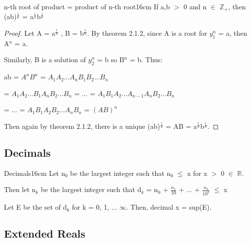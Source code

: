 	\newpage



	\begin{corollary}{n-th root of product = product of n-th root}{16cm}
		If a,b $>$ 0 and n $\in$ $\mathbb{Z}_+$, then
		(ab)$^{\frac{1}{n}}$ = a$^{\frac{1}{n}}$b$^{\frac{1}{n}}$
	\end{corollary}
	
	\begin{proof}
		Let A = a$^{\frac{1}{n}}$ , B = b$^{\frac{1}{n}}$.
		By {\color{red} theorem 2.1.2}, since A is a root for
		$y_1^n$ = a, then A$^n$ = a.

		Similarly, B is a solution of $y_2^n$ = b so B$^n$ = b. Thus:

		\hspace{1cm} ab = $A^n$$B^n$ = $A_1A_2...A_nB_1B_2...B_n$

		\hspace{1.6cm} = $A_1A_2...B_1A_nB_2...B_n$
		= ... = $A_1B_1A_2...A_{n-1}A_nB_2...B_n$

		\hspace{1.6cm} = ... = $A_1B_1A_2B_2...A_nB_n$ = $(AB)^n$

		Then again by {\color{red} theorem 2.1.2}, there is a unique
		(ab)$^{\frac{1}{n}}$ = AB = a$^{\frac{1}{n}}$b$^{\frac{1}{n}}$.		
	\end{proof}

	\vspace{0.5cm}




	
\subsection{ Decimals }

	\begin{definition}{Decimals}{16cm}
		Let n$_0$ be the largest integer such that n$_0$ $\leq$ x for
		x $>$ 0 $\in$ $\mathbb{R}$.

		Then let n$_k$ be the largest integer such that
		d$_k$ = n$_0$ + $\frac{n_1}{10}$ + ... + $\frac{n_k}{10^k}$ $\leq$ x

		Let E be the set of d$_k$ for k = 0, 1, ... $\infty$.
		Then, {\color{lblue} decimal} x = sup(E).	
	\end{definition}

	\vspace{0.5cm}





\subsection{ Extended Reals }

